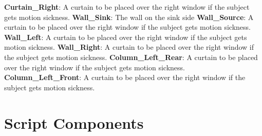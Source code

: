 \documentclass{article}
\begin{document}
\textbf{Curtain\_Right}: A curtain to be placed over the right window if the subject gets motion sickness. \newline \newline
\textbf{Wall\_Sink}: The wall on the sink side \newline \newline
\textbf{Wall\_Source}: A curtain to be placed over the right window if the subject gets motion sickness. \newline \newline
\textbf{Wall\_Left}: A curtain to be placed over the right window if the subject gets motion sickness. \newline \newline
\textbf{Wall\_Right}: A curtain to be placed over the right window if the subject gets motion sickness. \newline \newline
\textbf{Column\_Left\_Rear}: A curtain to be placed over the right window if the subject gets motion sickness. \newline \newline
\textbf{Column\_Left\_Front}: A curtain to be placed over the right window if the subject gets motion sickness. \newline \newline

\section{Script Components}
\end{document}
